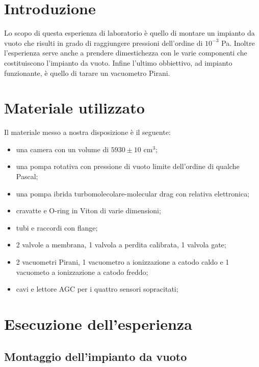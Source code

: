 \section{Introduzione}

Lo scopo di questa esperienza di laboratorio è quello di montare un impianto da vuoto che risulti in
grado di raggiungere pressioni dell'ordine di $10^{-3}$ \si{\pascal}. Inoltre l'esperienza serve anche a
prendere dimestichezza con le varie componenti che costituiscono l'impianto da vuoto.
Infine l'ultimo obbiettivo, ad impianto funzionante, è quello di tarare un vacuometro Pirani.

\section{Materiale utilizzato}

Il materiale messo a nostra disposizione è il seguente:
\begin{itemize}
	\item{una camera con un volume di $5930 \pm 10$ \si{\centi\metre}$^3$;}
	\item{una pompa rotativa con pressione di vuoto limite dell'ordine di qualche Pascal;}
	\item{una pompa ibrida turbomolecolare-molecular drag con relativa elettronica;}
	\item{cravatte e O-ring in Viton di varie dimensioni;}
	\item{tubi e raccordi con flange;}
	\item{2 valvole a membrana, 1 valvola a perdita calibrata, 1 valvola gate;}
	\item{2 vacuometri Pirani, 1 vacuometro a ionizzazione a catodo caldo e 1 vacuometo a ionizzazione a catodo freddo;}
	\item{cavi e lettore AGC per i quattro sensori sopracitati;}
\end{itemize}

\section{Esecuzione dell'esperienza}

\subsection{Montaggio dell'impianto da vuoto}

